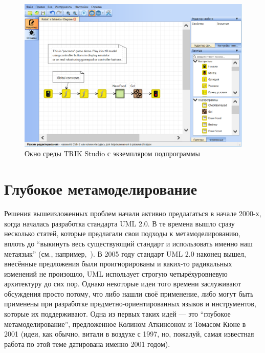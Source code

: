 \documentclass[a5paper]{article}
\begin{document}
\begin{figure}
	\begin{center}
		\includegraphics[width=\textwidth]{trikStudio.png}
	\end{center}
	\caption{Окно среды TRIK Studio с экземпляром подпрограммы}
	\label{figure:trikStudio}
\end{figure}

\section{Глубокое метамоделирование}

Решения вышеизложенных проблем начали активно предлагаться в начале 2000-х, когда началась разработка стандарта UML 2.0. В те времена вышло сразу несколько статей, которые предлагали свои подходы к метамоделированию, вплоть до ``выкинуть весь существующий стандарт и использовать именно наш метаязык'' (см., например,~\cite{alvarez2001mml}). В 2005 году стандарт UML 2.0 наконец вышел, внесённые предложения были проигнорированы и каких-то радикальных изменений не произошло, UML использует строгую четырёхуровневую архитектуру до сих пор. Однако некоторые идеи того времени заслуживают обсуждения просто потому, что либо нашли своё применение, либо могут быть применены при разработке предметно-ориентированных языков и инструментов, которые их поддерживают. Одна из первых таких идей --- это ``глубокое метамоделирование'', предложенное Колином Аткинсоном и Томасом Кюне в 2001 (идеи, как обычно, витали в воздухе с 1997, но, пожалуй, самая известная работа по этой теме датирована именно 2001 годом).
\end{document}
